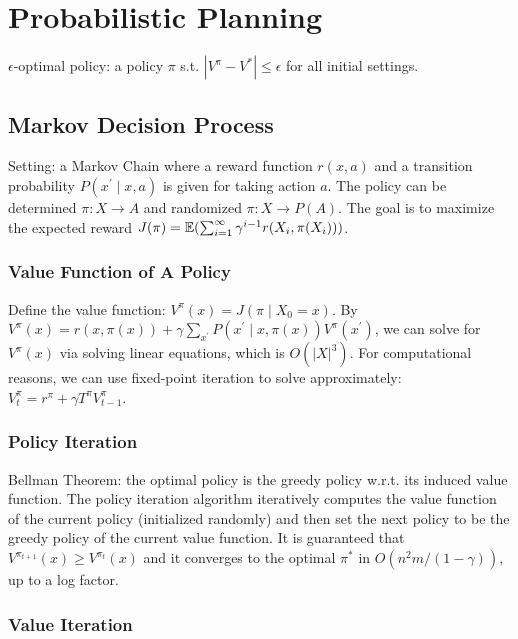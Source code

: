 \section{Probabilistic Planning}

$\epsilon$-optimal policy: a policy $\pi$ s.t. $|V^\pi-V^*|\le \epsilon$ for all initial settings.

\subsection{Markov Decision Process}

Setting: a Markov Chain where a reward function $r(x,a)$ and a transition probability $P(x^\prime\mid x, a)$ is given for taking action $a$. The policy can be determined $\pi: X\rightarrow A$ and randomized $\pi: X\rightarrow P(A)$. The goal is to maximize the expected reward $J(\pi)=\mathbb{E}(\sum_{i=1}^\infty \gamma^{i-1} r(X_i, \pi(X_i)))$.

\subsubsection*{Value Function of A Policy}

Define the value function: $V^\pi(x)=J(\pi\mid X_0=x)$. By $V^{\pi}(x)=r(x, \pi(x))+\gamma \sum_{x^{\prime}} P\left(x^{\prime} \mid x, \pi(x)\right) V^{\pi}\left(x^{\prime}\right)$, we can solve for $V^\pi(x)$ via solving linear equations, which is $O(|X|^3)$. 
For computational reasons, we can use fixed-point iteration to solve approximately:
 $V_{t}^{\pi}=r^{\pi}+\gamma T^{\pi} V_{t-1}^{\pi}$.



\subsubsection*{Policy Iteration}

Bellman Theorem: the optimal policy is the greedy policy w.r.t. its induced value function. The policy iteration algorithm iteratively computes the value function of the current policy (initialized randomly) and then set the next policy to be the greedy policy of the current value function. It is guaranteed that $V^{\pi_{t+1}}(x)\ge V^{\pi_t}(x)$ and it converges to the optimal $\pi^*$ in $O(n^2m/(1-\gamma))$, up to a log factor.

\subsubsection*{Value Iteration}

